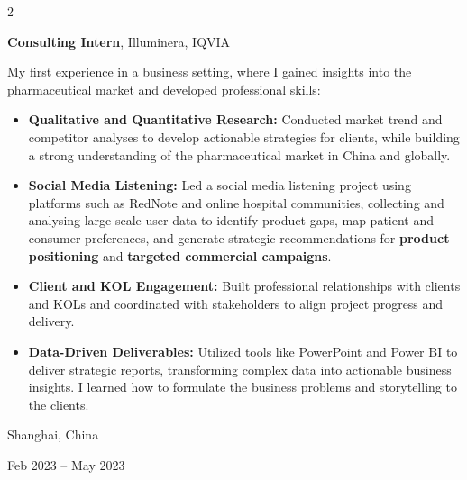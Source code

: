 \documentclass[10pt, letterpaper]{article}
\newenvironment{highlights}{
    \begin{itemize}[
        topsep=0.10 cm,
        parsep=0.10 cm,
        partopsep=0pt,
        itemsep=0pt,
        leftmargin=0.4 cm + 10pt
    ]
}{
    \end{itemize}
} %
\newenvironment{twocolentry}[2][]{
    \onecolentry
    \def\secondColumn{#2}
    \setcolumnwidth{\fill, 4.5 cm}
    \begin{paracol}{2}
}{
    \switchcolumn \raggedleft \secondColumn
    \end{paracol}
    \endonecolentry
} %
\begin{document}
        \begin{twocolentry}{
    Shanghai, China

    Feb 2023 – May 2023
}
    \textbf{Consulting Intern}, Illuminera, IQVIA

    \vspace{0.1cm}
    
    My first experience in a business setting, where I gained insights into the pharmaceutical market and developed professional skills:
    

    \begin{highlights}
        \item \textbf{Qualitative and Quantitative Research:} Conducted market trend and competitor analyses to develop actionable strategies for clients, while building a strong understanding of the pharmaceutical market in China and globally.

        \vspace{0.1cm}
 
        \item \textbf{Social Media Listening:} Led a social media listening project using platforms such as RedNote and online hospital communities, collecting and analysing large-scale user data to identify product gaps, map patient and consumer preferences, and generate strategic recommendations for \textbf{product positioning} and \textbf{targeted commercial campaigns}.

        \vspace{0.1cm}
        
        \item \textbf{Client and KOL Engagement:} Built professional relationships with clients and KOLs and coordinated with stakeholders to align project progress and delivery.

        \vspace{0.1cm}
        
        \item \textbf{Data-Driven Deliverables:} Utilized tools like PowerPoint and Power BI to deliver strategic reports, transforming complex data into actionable business insights. I learned how to formulate the business problems and storytelling to the clients. 
    \end{highlights}
\end{twocolentry}

        \vspace{0.3 cm}


    
\end{document}
